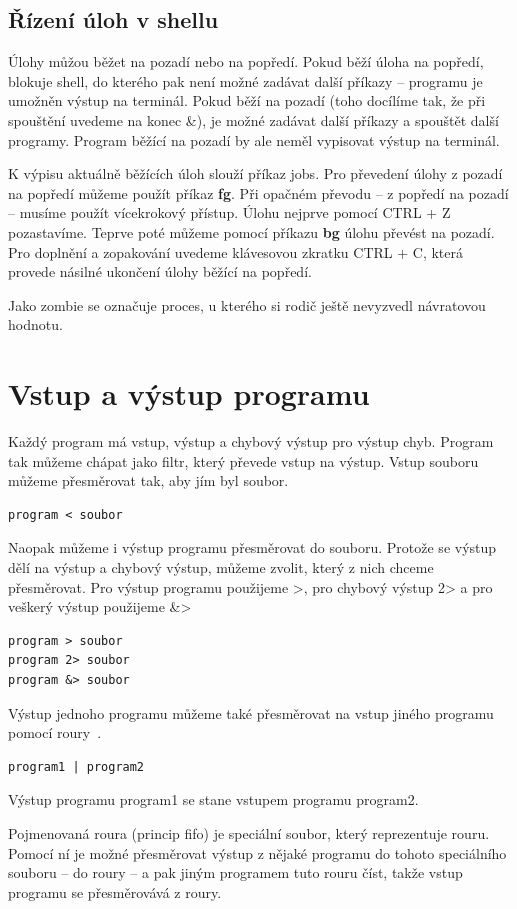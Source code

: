 \documentclass{article}
\begin{document}
\subsection{Řízení úloh v shellu}
Úlohy můžou běžet na pozadí nebo na popředí. Pokud běží úloha na popředí, blokuje shell, do kterého pak není možné zadávat další příkazy -- programu je umožněn výstup na terminál. Pokud běží na pozadí (toho docílíme tak, že při spouštění uvedeme na konec \&), je možné zadávat další příkazy a spouštět další programy. Program běžící na pozadí by ale neměl vypisovat výstup na terminál.

K výpisu aktuálně běžících úloh slouží příkaz jobs. Pro převedení úlohy z pozadí na popředí můžeme použít příkaz \textbf{fg}. Při opačném převodu -- z popředí na pozadí -- musíme použít vícekrokový přístup. Úlohu nejprve pomocí CTRL + Z pozastavíme. Teprve poté můžeme pomocí příkazu \textbf{bg} úlohu převést na pozadí. Pro doplnění a zopakování uvedeme klávesovou zkratku CTRL + C, která provede násilné ukončení úlohy běžící na popředí.	

Jako zombie se označuje proces, u kterého si rodič ještě nevyzvedl návratovou hodnotu.

\section{Vstup a výstup programu}
Každý program má vstup, výstup a chybový výstup pro výstup chyb. Program tak můžeme chápat jako filtr, který převede vstup na výstup. Vstup souboru můžeme přesměrovat tak, aby jím byl soubor.
\begin{verbatim}
program < soubor
\end{verbatim}

Naopak můžeme i výstup programu přesměrovat do souboru. Protože se výstup dělí na výstup a chybový výstup, můžeme zvolit, který z nich chceme přesměrovat. Pro výstup programu použijeme \textgreater, pro chybový výstup 2\textgreater{} a pro veškerý výstup použijeme \&\textgreater
\begin{verbatim}
program > soubor
program 2> soubor
program &> soubor
\end{verbatim}

Výstup jednoho programu můžeme také přesměrovat na vstup jiného programu pomocí roury~\textpipe. 
\begin{verbatim}
program1 | program2
\end{verbatim} 
Výstup programu program1 se stane vstupem programu program2.

Pojmenovaná roura (princip fifo) je speciální soubor, který reprezentuje rouru. Pomocí ní je možné přesměrovat výstup z nějaké programu do tohoto speciálního souboru -- do roury -- a pak jiným programem tuto rouru číst, takže vstup programu se přesměrovává z roury.
\end{document}
